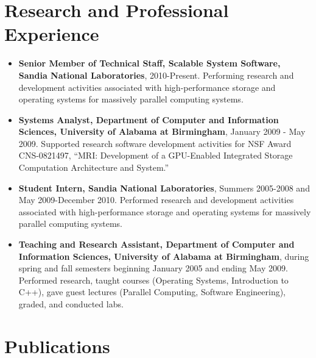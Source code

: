 \documentclass[11pt]{article}
\begin{document}
\vspace{-0.75em}
\section*{Research and Professional Experience}
\vspace{-0.75em}
\begin{itemize}
\item {\bf Senior Member of Technical Staff, Scalable System Software,
  Sandia National Laboratories}, 2010-Present. Performing research
  and development activities associated with high-performance storage
  and operating systems for massively parallel computing systems.
\item {\bf Systems Analyst, Department of Computer and Information
  Sciences, University of Alabama at Birmingham}, January 2009 - May
  2009. Supported research software development activities for NSF
  Award CNS-0821497, ``MRI: Development of a GPU-Enabled Integrated
  Storage Computation Architecture and System.''
\item {\bf Student Intern, Sandia National Laboratories}, Summers
  2005-2008 and May 2009-December 2010. Performed research and
  development activities associated with high-performance storage and
  operating systems for massively parallel computing systems.
\item {\bf Teaching and Research Assistant, Department of Computer and
  Information Sciences, University of Alabama at Birmingham}, during
  spring and fall semesters beginning January 2005 and ending May
  2009. Performed research, taught courses (Operating Systems,
  Introduction to C++), gave guest lectures (Parallel Computing,
  Software Engineering), graded, and conducted labs.
\end{itemize}

\vspace{-0.75em}
\section*{Publications}
\vspace{-0.75em}
\end{document}
